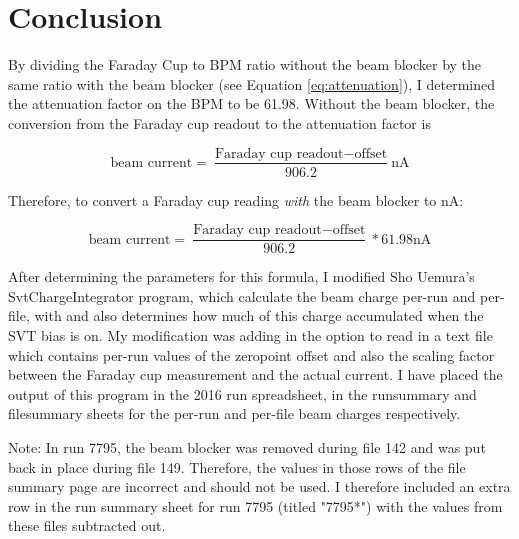 \documentclass[11pt]{article}
\begin{document}
\section{Conclusion}
By dividing the Faraday Cup to BPM ratio without the beam blocker by the same ratio with the beam blocker (see Equation \ref{eq:attenuation}), I determined the attenuation factor on the BPM to be 61.98.  Without the beam blocker, the conversion from the Faraday cup readout to the attenuation factor is 

\begin{equation}\label{eq:without_blocker}
\textrm{beam current} = \frac{\textrm{Faraday cup readout}-\textrm{offset}}{906.2} \textrm{nA}
\end{equation}

Therefore, to convert a Faraday cup reading \textit{with} the beam blocker to nA:

\begin{equation}\label{eq:with_blocker}
\textrm{beam current} = \frac{\textrm{Faraday cup readout}-\textrm{offset}}{906.2}*61.98 \textrm{nA}
\end{equation} 

After determining the parameters for this formula, I modified Sho Uemura's SvtChargeIntegrator program, which calculate the beam charge per-run and per-file, with and also determines how much of this charge accumulated when the  SVT bias is on.   My modification was adding in the option to read in a text file which contains per-run values of the zeropoint offset and also the scaling factor between the Faraday cup measurement and the actual current.  I have placed the output of this program in the 2016 run spreadsheet, in the runsummary and filesummary sheets for the per-run and per-file beam charges respectively.  

Note: In run 7795, the beam blocker was removed during file 142 and was put back in place during file 149.  Therefore, the values in those rows of the file summary page are incorrect and should not be used.  I therefore included an extra row in the run summary sheet for run 7795 (titled "7795*") with the values from these files subtracted out.  
\end{document}
